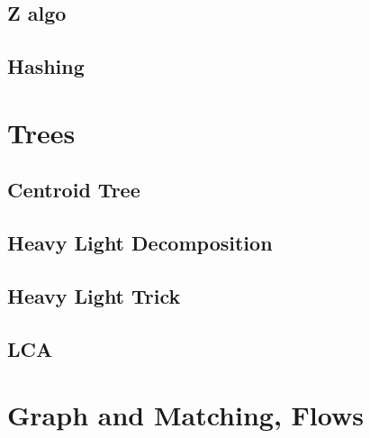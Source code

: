 \documentclass[12pt]{extarticle}
\begin{document}
\begin{multicols*}{2}
\subsection{Z algo} %


\subsection{Hashing} %




\section{Trees}

\subsection{Centroid Tree} %


\subsection{Heavy Light Decomposition} %


\subsection{Heavy Light Trick} %


\subsection{LCA} %


% 

\section{Graph and Matching, Flows}

% 


\end{multicols*}
\end{document}
